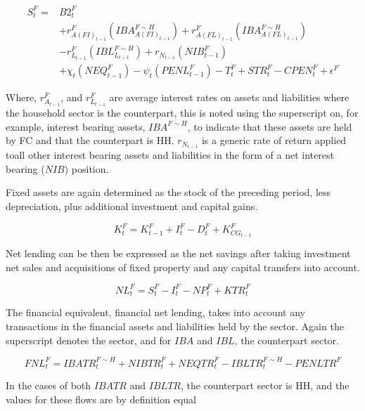 \documentclass[
]{book}
\begin{document}
\begin{equation}
\begin{split}
    S^F_t = & B2^F_t \\
            & + r^F_{A(FI)_{t-1}}(IBA^{F\sim H}_{A(FI)_{t-1}}) + r^F_{A(FL)_{t-1}}(IBA^{F\sim H}_{A(FL)_{t-1}}) \\
            & - r^F_{L_{t-1}}(IBL^{F\sim H}_{L_{t-1}}) + r_{N_{t-1}}(NIB^F_{t-1}) \\
            & + \chi _t(NEQ^F_{t-1}) -\psi _t(PENL^F_{t-1}) - T^F_t + STR^F_t - CPEN^F_t + \epsilon ^F
\end{split}
\end{equation}

Where, \(r^F_{A_{t-1}}\), and \(r^F_{L_{t-1}}\) are average interest rates on
assets and liabilities where the household sector is the counterpart, this is
noted using the superscript on, for example, interest bearing assets, \(IBA^{F\sim H}\),
to indicate that these assets are held by FC and that the counterpart is HH.
\(r_{N_{t-1}}\) is a generic rate of return applied toall other interest bearing
assets and liabilities in the form of a net interest bearing (\(NIB\)) position.

Fixed assets are again determined as the stock of the preceding period,
less depreciation, plus additional investment and capital gains.

\begin{equation}
K^F_t = K^F_{t-1} + I^F_t - D^F_t + K^F_{CG_{t-1}}
\end{equation}

Net lending can be then be expressed as the net savings after taking investment
net sales and acquisitions of fixed property and any capital transfers into account.

\begin{equation}
NL^F_t = S^F_t - I^F_t - NP^F_t + KTR^F_t
\end{equation}

The financial equivalent, financial net lending, takes into account any
transactions in the financial assets and liabilities held by the sector.
Again the superscript denotes the sector, and for \(IBA\) and \(IBL\), the counterpart
sector.

\begin{equation}
FNL^F_t = IBATR^{F\sim H}_t + NIBTR^F_t + NEQTR^F_t - IBLTR^{F\sim H}_t - PENLTR^F
\end{equation}

In the cases of both \(IBATR\) and \(IBLTR\), the counterpart sector is HH,
and the values for these flows are by definition equal
\end{document}

